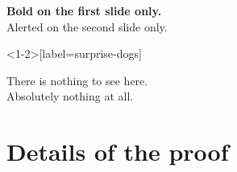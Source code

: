 \documentclass{beamer}
\begin{document}
\begin{frame}

\textbf<1>{Bold on the first slide only.}\\
\alert<2>{Alerted on the second slide only.}

\end{frame}


\begin{frame}<1-2>[label=surprise-dogs]

There is nothing to see here.\\
Absolutely nothing at all.\\

\end{frame}





\section{Details of the proof}

\sectionpage
\end{document}
